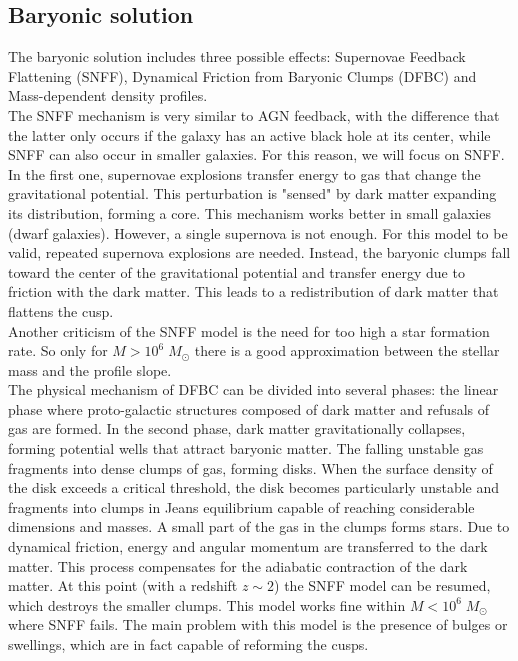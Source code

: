 \subsection{Baryonic solution}
The baryonic solution includes three possible effects: Supernovae Feedback Flattening (SNFF), Dynamical Friction from Baryonic Clumps (DFBC) and Mass-dependent density profiles.\\
The SNFF mechanism is very similar to AGN feedback, with the difference that the latter only occurs if the galaxy has an active black hole at its center, while SNFF can also occur in smaller galaxies. For this reason, we will focus on SNFF.
In the first one, supernovae explosions transfer energy to gas that change the gravitational potential. This perturbation is "sensed" by dark matter expanding its distribution, forming a core. This mechanism works better in small galaxies (dwarf galaxies). However, a single supernova is not enough. For this model to be valid, repeated supernova explosions are needed.
Instead, the baryonic clumps fall toward the center of the gravitational potential and transfer energy due to friction with the dark matter. This leads to a redistribution of dark matter that flattens the cusp.\\ 
Another criticism of the SNFF model is the need for too high a star formation rate. So only for $M > 10^6 \; M_\odot$ there is a good approximation between the stellar mass and the profile slope.\\ The physical mechanism of DFBC can be divided into several phases: the linear phase where proto-galactic structures composed of dark matter and refusals of gas are formed. In the second phase, dark matter gravitationally collapses, forming potential wells that attract baryonic matter. The falling unstable gas fragments into dense clumps of gas, forming disks. When the surface density of the disk exceeds a critical threshold, the disk becomes particularly unstable and fragments into clumps in Jeans equilibrium capable of reaching considerable dimensions and masses. A small part of the gas in the clumps forms stars. Due to dynamical friction, energy and angular momentum are transferred to the dark matter. This process compensates for the adiabatic contraction of the dark matter. At this point (with a redshift $z\sim2$) the SNFF model can be resumed, which destroys the smaller clumps. This model works fine within $M < 10^6 \; M_\odot$ where SNFF fails. The main problem with this model is the presence of bulges or swellings, which are in fact capable of reforming the cusps.\\

